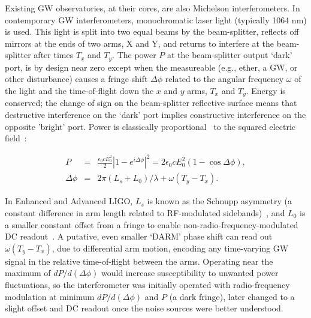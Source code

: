 Existing GW observatories, at their cores, are also Michelson interferometers. 
In contemporary GW interferometers, monochromatic laser light (typically 1064 nm) is used.
This light is split into two equal beams by the beam-splitter, reflects off mirrors at the ends of two arms, X and Y, and returns to interfere at the beam-splitter after times $T_x$ and $T_y$.
The power $P$ at the beam-splitter output `dark' port, is by design near zero except when the measureable (e.g., ether, a GW, or other disturbance) causes a fringe shift $\Delta \phi$ related to the angular frequency $\omega$ of the light and the time-of-flight down the $x$ and $y$ arms, $T_x$ and $T_y$. 
Energy is conserved; the change of sign on the beam-splitter reflective surface means that destructive interference on the `dark' port implies constructive interference on the opposite 'bright' port.
Power is classically proportional~\cite{JacksonEM} to the squared electric field~\cite{Saulson}:

\begin{eqnarray}
P &=& \frac{\epsilon_0 c E_0^2}{2} \left| 1 - e^{i \Delta \phi}\right|^2 = 2 \epsilon_0 c E_0^2 (1 - \cos \Delta {\phi}),
\label{michelson-interferometry-eq}\\
\Delta \phi &=& 2\pi (L_s + L_0) /\lambda + \omega (T_y - T_x).
\end{eqnarray}

In Enhanced and Advanced LIGO, $L_s$ is known as the Schnupp asymmetry (a constant difference in arm length related to RF-modulated sidebands)~\cite{AdhikariThesis}, and $L_0$ is a smaller constant offset from a fringe to enable non-radio-frequency-modulated DC readout~\cite{FrickeThesis}.
A putative, even smaller `DARM' phase shift can read out $\omega (T_y -T_x)$, due to differential arm motion, encoding any time-varying GW signal in the relative time-of-flight between the arms. 
Operating near the maximum of $dP/d(\Delta\phi)$ would increase susceptibility to unwanted power fluctuations, so the interferometer was initially operated with radio-frequency modulation at minimum $dP/d(\Delta\phi)$ and  $P$ (a dark fringe), later changed to a slight offset and DC readout once the noise sources were better understood.


